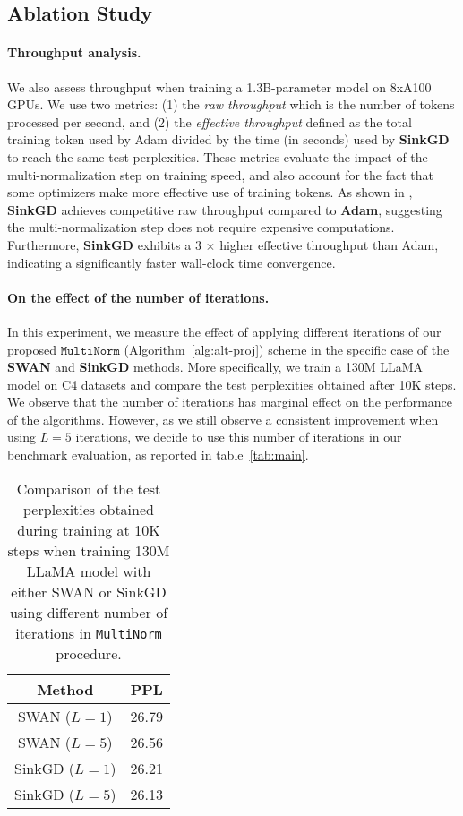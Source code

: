 \subsection{Ablation Study}
\label{sec:ablation}

\paragraph{Throughput analysis.} We also assess throughput when training a 1.3B-parameter model on 8xA100 GPUs. We use two metrics: (1) the \emph{raw throughput} which is the number of tokens processed per second, and (2) the \emph{effective throughput} defined as the total training token used by Adam divided by the time (in seconds) used by \textbf{SinkGD} to reach the same test perplexities.
These metrics evaluate the impact of the multi-normalization step on training speed, and also account for the fact that some optimizers make more effective use of training tokens. As shown in , \textbf{SinkGD} achieves competitive raw throughput compared to \textbf{Adam}, suggesting the multi-normalization step does not require expensive computations. Furthermore, \textbf{SinkGD} exhibits a 3 $\times$ higher effective throughput than Adam, indicating a significantly faster wall-clock time convergence.


\paragraph{On the effect of the number of iterations.} In this experiment, we measure the effect of applying different iterations of our proposed $\texttt{MultiNorm}$ (Algorithm~\ref{alg:alt-proj}) scheme in the specific case of the \textbf{SWAN} and \textbf{SinkGD} methods. More specifically, we train a 130M LLaMA model on C4 datasets and compare the test perplexities obtained after 10K steps. We observe that the number of iterations has marginal effect on the performance of the algorithms. However, as we still observe a consistent improvement when using $L=5$ iterations, we decide to use this number of iterations in our benchmark evaluation, as reported in table~\ref{tab:main}.  

\begin{table}[H]
\vspace{-0.5cm}
\centering
\caption{Comparison of the test perplexities obtained during training at 10K steps when training 130M LLaMA model with either SWAN or SinkGD using different number of iterations in \texttt{MultiNorm} procedure.}
\label{tab:num-iter}
\begin{tabular}{|c|c|}
\hline
Method           & PPL   \\ 
\hline
SWAN ($L=1$) & 26.79 \\ 
SWAN ($L=5$) & 26.56\\ 
\hline
SinkGD ($L=1$)     & 26.21  \\ 
SinkGD ($L=5$)    & 26.13  \\ 
\hline
\end{tabular}
\end{table}